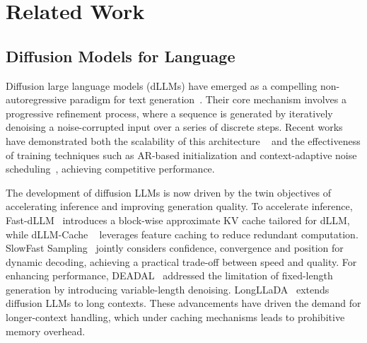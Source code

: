 \section{Related Work}
\subsection{Diffusion Models for Language}
Diffusion large language models (dLLMs) have emerged as a compelling non-autoregressive paradigm for text generation~\citep{li2025survey}. Their core mechanism involves a progressive refinement process, where a sequence is generated by iteratively denoising a noise-corrupted input over a series of discrete steps.
Recent works have demonstrated both the scalability of this architecture ~\citep{nie2025large} and the effectiveness of training techniques such as AR-based initialization and context-adaptive noise scheduling~\citep{ye2025dream}, achieving competitive performance.

The development of diffusion LLMs is now driven by the twin objectives of accelerating inference and improving generation quality.
To accelerate inference, Fast-dLLM~\citep{wu2025fast} introduces a block-wise approximate KV cache tailored for dLLM, while dLLM-Cache ~\citep{liu2025dllm} leverages feature caching to reduce redundant computation. SlowFast Sampling~\citep{wei2025accelerating} jointly considers confidence, convergence and position  for dynamic decoding, achieving a practical trade-off between speed and quality.
For enhancing performance, DEADAL~\citep{li2025beyond} addressed the limitation of fixed-length generation by introducing variable-length denoising.
LongLLaDA~\citep{liu2025longllada} extends diffusion LLMs to long contexts. These advancements have driven the demand for longer-context handling, which under caching mechanisms leads to prohibitive memory overhead.

